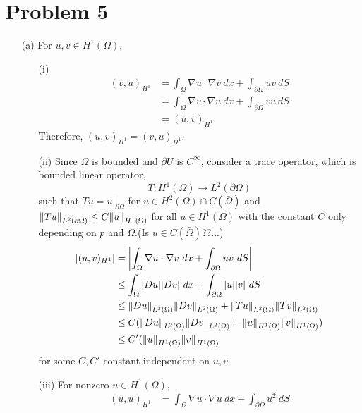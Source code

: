 \documentclass{article}
\begin{document}
\section*{Problem 5}
\begin{enumerate}
\item[(a)] For $u,v\in H^1(\Omega)$,
\begin{enumerate}
\item[(i)]
\begin{equation*}
\begin{split}
(v,u)_{H^1}&=\int_\Omega \nabla u\cdot \nabla v~dx+\int_{\partial \Omega} uv~dS\\
&=\int_\Omega \nabla v\cdot \nabla u~dx+\int_{\partial \Omega} vu~dS \\
&=(u,v)_{H^1}
\end{split}
\end{equation*}
Therefore, $(u,v)_{H^1}=(v,u)_{H^1}$.
\item[(ii)] Since $\Omega$ is bounded and $\partial U$ is $C^\infty$, consider a trace operator, which is bounded linear operator,
\begin{equation*}
T:H^1(\Omega)\rightarrow L^2(\partial \Omega)
\end{equation*}
such that $Tu=u|_{\partial \Omega}$ for $u\in H^2(\Omega)\cap C(\bar{\Omega})$ and $\norm{Tu}_{L^2(\partial\Omega)}\leq C\norm{u}_{H^1(\Omega)}$ for all $u\in H^1(\Omega)$ with the constant $C$ only depending on $p$ and $\Omega$.(Is $u\in C(\bar{\Omega})$??...)
\begin{equation*}
\begin{split}
\abs{(u,v)_{H^1}}&=\abs{\int_\Omega \nabla u\cdot \nabla v~dx+\int_{\partial \Omega} uv~dS} \\
&\leq \int_\Omega \abs{Du}\abs{Dv}~dx+\int_{\partial \Omega} \abs{u}\abs{v}~dS \\
&\leq \norm{Du}_{L^2(\Omega)}\norm{Dv}_{L^2(\Omega)}+\norm{Tu}_{L^2(\Omega)}\norm{Tv}_{L^2(\Omega)}\\
&\leq C(\norm{Du}_{L^2(\Omega)}\norm{Dv}_{L^2(\Omega)}+\norm{u}_{H^1(\Omega)}\norm{v}_{H^1(\Omega)}) \\
&\leq C'(\norm{u}_{H^1(\Omega)}\norm{v}_{H^1(\Omega)}
\end{split}
\end{equation*}
for some $C, C'$ constant independent on $u,v$.
\item[(iii)] For nonzero $u\in H^1(\Omega)$,
\begin{equation*}
\begin{split}
(u,u)_{H^1}&=\int_\Omega \nabla u\cdot \nabla u~dx+\int_{\partial \Omega} u^2~dS\\

\end{split}
\end{equation*}
\end{enumerate}
\end{enumerate}
\end{document}
